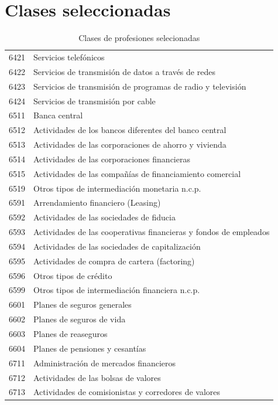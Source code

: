 \documentclass[a4paper]{article}
\begin{document}
    \section{Clases seleccionadas}
\begin{table}[H]
	\caption{Clases de profesiones selecionadas}
	\begin{tabular}{|rl|}
		\toprule
		6421  & Servicios telefónicos \\
		6422  & Servicios de transmisión de datos a través de redes \\
		6423  & Servicios de transmisión de programas de radio y televisión \\
		6424  & Servicios de transmisión por cable \\
		6511  & Banca central \\
		6512  & Actividades de los bancos diferentes del banco central \\
		6513  & Actividades de las corporaciones de ahorro y vivienda \\
		6514  & Actividades de las corporaciones financieras \\
		6515  & Actividades de las compañías de financiamiento comercial \\
		6519  & Otros tipos de intermediación monetaria n.c.p. \\
		6591  & Arrendamiento financiero (Leasing)  \\
		6592  & Actividades de las sociedades de fiducia \\
		6593  & Actividades de las cooperativas financieras y fondos de empleados \\
		6594  & Actividades de las sociedades de capitalización \\
		6595  & Actividades de compra de cartera (factoring) \\
		6596  & Otros tipos de crédito \\
		6599  & Otros tipos de intermediación financiera n.c.p. \\
		6601  & Planes de seguros generales \\
		6602  & Planes de seguros de vida \\
		6603  & Planes de reaseguros \\
		6604  & Planes de pensiones y cesantías \\
		6711  & Administración de mercados financieros \\
		6712  & Actividades de las bolsas de valores \\
		6713  & Actividades de comisionistas y corredores de valores \\

\end{tabular}
\end{table}
\end{document}
